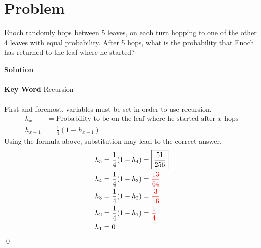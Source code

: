 \documentclass{article}
\newenvironment{solution}{\begin{trivlist}\item[]{\bf Solution}}{\qed \end{trivlist}}
\begin{document}
\newpage
\section*{Problem}
Enoch randomly hops between 5 leaves, on each turn hopping to one of the other 4 leaves with equal probability. After 5 hops, what is the probability that Enoch has returned to the leaf where he started?
\begin{solution}
\\\\
\textbf{Key Word} Recursion
\\\\
First and foremost, variables must be set in order to use recursion.
\begin{align*}
    h_x&=\text{Probability to be on the leaf where he started after $x$ hops} \\
    h_{x-1}&=\frac{1}{4}(1-h_{x-1})
\end{align*}
Using the formula above, substitution may lead to the correct answer.
\begin{align*}
    h_5&=\frac{1}{4}(1-h_4)=\boxed{\frac{51}{256}} \\
    h_4&=\frac{1}{4}(1-h_3)=\textcolor{red}{\frac{13}{64}} \\
    h_3&=\frac{1}{4}(1-h_2)=\textcolor{red}{\frac{3}{16}} \\
    h_2&=\frac{1}{4}(1-h_1)=\textcolor{red}{\frac{1}{4}} \\
    h_1&=0 \\
\end{align*}
\end{solution}

\newpage
\end{document}
